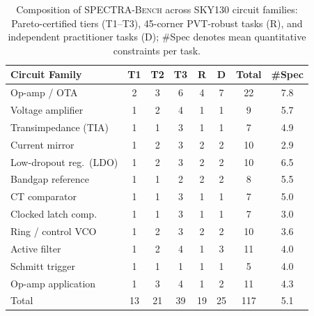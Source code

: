 \begin{table}[t]
\centering
\caption{Composition of \textsc{SPECTRA-Bench} across \NPrimaryFamilies{} SKY130 circuit families: Pareto-certified tiers (T1--T3), 45-corner PVT-robust tasks (R), and independent practitioner tasks (D); \#Spec denotes mean quantitative constraints per task.}
\label{tab:bench}
\scriptsize
\setlength{\tabcolsep}{3pt}
\begin{tabular}{@{}lccccccc@{}}
\toprule
Circuit Family & T1 & T2 & T3 & R & D & Total & \#Spec \\
\midrule
Op-amp / OTA & 2 & 3 & 6 & 4 & 7 & 22 & 7.8 \\
Voltage amplifier & 1 & 2 & 4 & 1 & 1 & 9 & 5.7 \\
Transimpedance (TIA) & 1 & 1 & 3 & 1 & 1 & 7 & 4.9 \\
Current mirror & 1 & 2 & 3 & 2 & 2 & 10 & 2.9 \\
Low-dropout reg.\ (LDO) & 1 & 2 & 3 & 2 & 2 & 10 & 6.5 \\
Bandgap reference & 1 & 1 & 2 & 2 & 2 & 8 & 5.5 \\
CT comparator & 1 & 1 & 3 & 1 & 1 & 7 & 5.0 \\
Clocked latch comp. & 1 & 1 & 3 & 1 & 1 & 7 & 3.0 \\
Ring / control VCO & 1 & 2 & 3 & 2 & 2 & 10 & 3.6 \\
Active filter & 1 & 2 & 4 & 1 & 3 & 11 & 4.0 \\
Schmitt trigger & 1 & 1 & 1 & 1 & 1 & 5 & 4.0 \\
Op-amp application & 1 & 3 & 4 & 1 & 2 & 11 & 4.3 \\
\midrule
Total & 13 & 21 & 39 & 19 & 25 & 117 & 5.1 \\
\bottomrule
\end{tabular}
\end{table}
